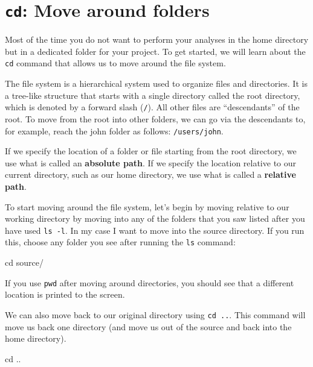 \documentclass[
  letterpaper,
  DIV=11,
  numbers=noendperiod]{scrreprt}
\newenvironment{Shaded}{}{}
\newcommand{\BuiltInTok}[1]{\textcolor[rgb]{0.84,0.23,0.29}{#1}}
\newcommand{\NormalTok}[1]{\textcolor[rgb]{0.14,0.16,0.18}{#1}}
\begin{document}
\section{\texorpdfstring{\texttt{cd}: Move around
folders}{cd: Move around folders}}\label{cd-move-around-folders}

Most of the time you do not want to perform your analyses in the home
directory but in a dedicated folder for your project. To get started, we
will learn about the \texttt{cd} command that allows us to move around
the file system.

The file system is a hierarchical system used to organize files and
directories. It is a tree-like structure that starts with a single
directory called the root directory, which is denoted by a forward slash
(\texttt{/}). All other files are ``descendants'' of the root. To move
from the root into other folders, we can go via the descendants to, for
example, reach the john folder as follows: \texttt{/users/john}.

If we specify the location of a folder or file starting from the root
directory, we use what is called an \textbf{absolute path}. If we
specify the location relative to our current directory, such as our home
directory, we use what is called a \textbf{relative path}.

To start moving around the file system, let's begin by moving relative
to our working directory by moving into any of the folders that you saw
listed after you have used \texttt{ls\ -l}. In my case I want to move
into the source directory. If you run this, choose any folder you see
after running the \texttt{ls} command:

\begin{Shaded}
\begin{Highlighting}[]
\BuiltInTok{cd}\NormalTok{ source/}
\end{Highlighting}
\end{Shaded}

If you use \texttt{pwd} after moving around directories, you should see
that a different location is printed to the screen.

We can also move back to our original directory using \texttt{cd\ ..}.
This command will move us back one directory (and move us out of the
source and back into the home directory).

\begin{Shaded}
\begin{Highlighting}[]
\BuiltInTok{cd}\NormalTok{ ..}
\end{Highlighting}
\end{Shaded}
\end{document}
